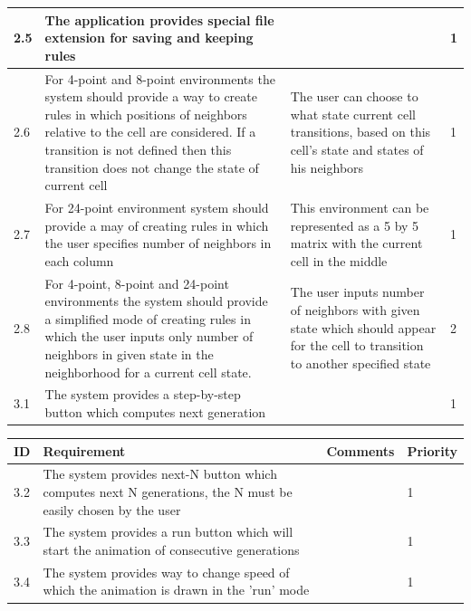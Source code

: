 \documentclass{article}
\begin{document}
\begin{center}
\begin{tabular}{| l | p{7cm} | p{5cm} | l |}
		2.5 & 
		The application provides special file extension for saving and keeping rules & 
		 &
		1 
		\\ \hline
				
		2.6 &
		For 4-point and 8-point environments the system should provide a way to create rules
		in which positions of neighbors relative to the cell are considered. If
		a transition is not defined then this transition does not change the state of current cell
		 &
		The user can choose to what state current cell transitions, based on this cell's state 
		and states of his neighbors &
		1 
		\\ \hline

		2.7 &
		For 24-point environment system should provide a may of creating rules in which 
		the user specifies number of neighbors in each column
		&	
		This environment can be represented as a 5 by 5 matrix with the current cell in the middle &
		1 
		\\ \hline

		2.8 &
		For 4-point, 8-point and 24-point environments the system should provide a simplified
		mode of creating rules in which the user inputs only number of neighbors in given state
		in the neighborhood for a current cell state. &
		The user inputs number of neighbors with given state which should appear for the
		cell to transition to another specified state &
		2 
		\\ \hline
				
		3.1 & 
		The system provides a step-by-step button which computes next generation & 
		 &
		1 

		\\ \hline



	\end{tabular}
\hspace*{-2.1cm}
	\begin{tabular}{| l | p{7cm} | p{5cm} | l |}
		\hline
	  	ID & Requirement & Comments & Priority \\
		 \hline

		3.2 & 
		The system provides next-N button which computes next N generations,
		the N must be easily chosen by the user & 
	 		&
		1
		\\ \hline

		3.3 & 
		The system provides a run button which will
		start the animation of consecutive generations & 
		 &
		1
		\\ \hline
		
		3.4 & 
		The system provides way to change speed of which the animation is drawn in the 'run' mode & 
		 &
		1
		\\ \hline


\end{tabular}
\end{center}
\end{document}
